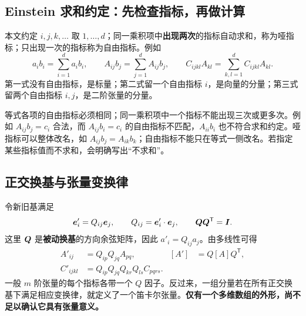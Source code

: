\subsection{Einstein 求和约定：先检查指标，再做计算}\label{subsec:einstein}

本文约定 $i,j,k,\ldots$ 取 $1,\ldots,d$；同一乘积项中\textbf{出现两次}的指标自动求和，称为哑指标；只出现一次的指标称为自由指标。例如
\begin{equation}
 a_ib_i=\sum_{i=1}^d a_ib_i,\qquad
 A_{ij}b_j=\sum_{j=1}^d A_{ij}b_j,\qquad
 C_{ijkl}A_{kl}=\sum_{k,l=1}^d C_{ijkl}A_{kl}.
\end{equation}
第一式没有自由指标，是标量；第二式留一个自由指标 $i$，是向量的分量；第三式留两个自由指标 $i,j$，是二阶张量的分量。

\begin{warningbox}
等式各项的自由指标必须相同；同一乘积项中一个指标不能出现三次或更多次。例如 $A_{ij}b_j=c_i$ 合法，而 $A_{ij}b_i=c_i$ 的自由指标不匹配，$A_{ii}b_i$ 也不符合求和约定。哑指标可以整体改名，如 $A_{ij}b_j=A_{ik}b_k$；自由指标不能只在等式一侧改名。若指定某些指标值而不求和，会明确写出“不求和”。
\end{warningbox}

\subsection{正交换基与张量变换律}\label{subsec:tensor-transform}

令新旧基满足
\begin{equation}
 \bm{e}'_i=Q_{ij}\bm{e}_j,\qquad
 Q_{ij}=\bm{e}'_i\cdot\bm{e}_j,\qquad
 \bm{Q}\bm{Q}^{\mathsf T}=\bm{I}.
\end{equation}
这里 $\bm{Q}$ 是\textbf{被动换基}的方向余弦矩阵，因此 $a'_i=Q_{ij}a_j$。由多线性可得
\begin{align}
 A'_{ij}&=Q_{ip}Q_{jq}A_{pq},
 & [A']&=Q[A]Q^{\mathsf T},\label{eq:tensor-transform-two}\\
 C'_{ijkl}&=Q_{ip}Q_{jq}Q_{kr}Q_{ls}C_{pqrs}.\label{eq:tensor-transform-four}
\end{align}
一般 $m$ 阶张量的每个指标各带一个 $Q$ 因子。反过来，一组分量若在所有正交换基下满足相应变换律，就定义了一个笛卡尔张量。\textbf{仅有一个多维数组的外形，尚不足以确认它具有张量意义。}

